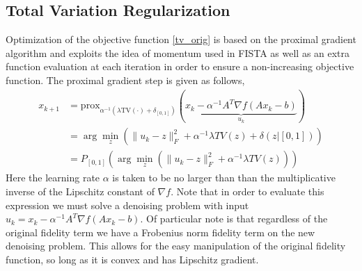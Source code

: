 \documentclass[10pt,a4paper]{article}
\newcommand{\prox}{\mathrm{prox}}
\begin{document}
	\subsection{Total Variation Regularization}
	
	Optimization of the objective function \eqref{tv_orig} is based on the proximal gradient algorithm and exploits the idea of momentum used in FISTA as well as an extra function evaluation at each iteration in order to ensure a non-increasing objective function.  The proximal gradient step is given as follows,
	\begin{align*}
	x_{k+1} &= \prox_{\alpha^{-1}(\lambda \textrm{TV}(\cdot) + \delta_{[0,1]})} (\underbrace{x_k - \alpha^{-1} A^T\nabla f (Ax_k - b)}_{u_k}) \\
	&= \arg \min_z \left( \|u_k - z\|_F^2 + \alpha^{-1}\lambda TV(z) + \delta(z | [0,1]) \right) \\
	&= P_{[0,1]}  \left( \arg \min_z \left( \|u_k - z\|_F^2 + \alpha^{-1}\lambda TV(z) \right) \right)
	\end{align*}
	Here the learning rate $\alpha$ is taken to be no larger than than the multiplicative inverse of the Lipschitz constant of $\nabla f$.  Note that in order to evaluate this expression we must solve a denoising problem with input $u_k = x_k - \alpha^{-1} A^T\nabla f (Ax_k - b)$.  Of particular note is that regardless of the original fidelity term we have a Frobenius norm fidelity term on the new denoising problem.  This allows for the easy manipulation of the original fidelity function, so long as it is convex and has Lipschitz gradient.
	
\end{document}
